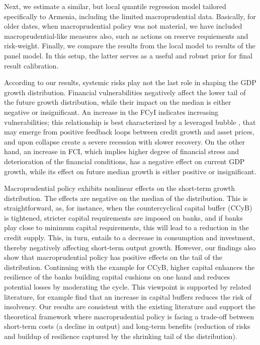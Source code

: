 \documentclass[12pt,a4paper]{article}
\begin{document}
Next, we estimate a similar, but local quantile regression model tailored specifically to Armenia, including the limited macroprudential data. Basically, for older dates, when macroprudential policy was not material, we have included macroprudential-like measures also, such as actions on reserve requiements and risk-weight. Finally, we compare the results from the local model  to results of the panel model. In this setup, the latter serves as a useful and robust prior for final result calibration.

According to our results, systemic risks play not the last role in shaping the GDP growth distribution. Financial vulnerabilities negatively affect the lower tail of the future growth distribution, while their impact on the median is either negative or insignificant. An increase in the FCyI indicates increasing vulnerabilities; this relationship is best characterized by a leveraged bubble \citep{jorda2015}, that may emerge from positive feedback loops between credit growth and asset prices, and upon collapse create a severe recession with slower recovery. On the other hand, an increase in FCI, which implies higher degree of financial stress and deterioration of the financial conditions, has a negative effect on current GDP growth, while its effect on future median growth is either positive or insignificant.

Macroprudential policy exhibits nonlinear effects on the short-term growth distribution. The effects are negative on the median of the distribution. This is straightforward, as, for instance, when the countercyclical capital buffer (CCyB) is tightened, stricter capital requirements are imposed on banks, and if banks play close to minimum capital requirements, this will lead to a reduction in the credit supply. This, in turn, entails to a decrease in consumption and investment, thereby negatively affecting short-term output growth. However, our findings also show that macroprudential policy has positive effects on the tail of the distribution. Continuing with the example for CCyB, higher capital enhances the resilience of the banks building capital cushions on one hand and reduces potential losses by moderating the cycle. This viewpoint is supported by related literature, for example \citet{jimnez2017} find that an increase in capital buffers reduces the risk of insolvency. Our results are consistent with the existing literature \citep{galan2020} and support the theoretical framework where macroprudential policy is facing a trade-off between short-term costs (a decline in output) and long-term benefits (reduction of risks and buildup of resilience captured by the shrinking tail of the distribution).
\end{document}
